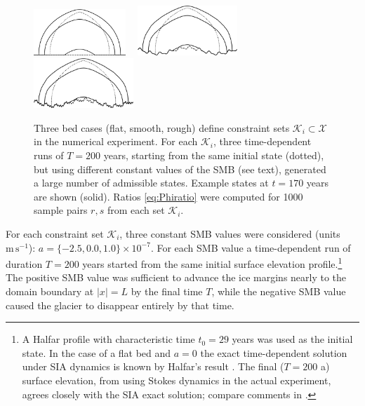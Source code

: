 \documentclass[hidelinks,onefignum,onetabnum,final]{siamart220329}  %
\newcommand{\cK}{\mathcal{K}}
\newcommand{\cX}{\mathcal{X}}
\begin{document}
\begin{figure}[ht]
\mbox{\includegraphics[width=0.31\textwidth]{figs/snapsflat.png} \, \includegraphics[width=0.335\textwidth]{figs/snapssmooth.png} \, \includegraphics[width=0.335\textwidth]{figs/snapsrough.png}}

\caption{Three bed cases (flat, smooth, rough) define constraint sets $\cK_i\subset\cX$ in the numerical experiment.  For each $\cK_i$, three time-dependent runs of $T=200$ years, starting from the same initial state (dotted), but using different constant values of the SMB (see text), generated a large number of admissible states.  Example states at $t=170$ years are shown (solid).  Ratios \eqref{eq:Phiratio} were computed for 1000 sample pairs $r,s$ from each set $\cK_i$.}
\label{fig:cases}
\end{figure}

For each constraint set $\cK_i$, three constant SMB values were considered (units $\text{m}\,\text{s}^{-1}$): $a=\{-2.5,0.0,1.0\}\times 10^{-7}$.  For each SMB value a time-dependent run of duration $T=200$ years started from the same initial surface elevation profile.\footnote{A Halfar profile \cite{Halfar1981} with characteristic time $t_0=29$ years was used as the initial state.  In the case of a flat bed and $a=0$ the exact time-dependent solution under SIA dynamics is known by Halfar's result \cite{Halfar1981}.  The final ($T=200$ a) surface elevation, from using Stokes dynamics in the actual experiment, agrees closely with the SIA exact solution; compare comments in \cite{LofgrenAhlkronaHelanow2022}.}  The positive SMB value was sufficient to advance the ice margins nearly to the domain boundary at $|x|=L$ by the final time $T$, while the negative SMB value caused the glacier to disappear entirely by that time.
\end{document}
